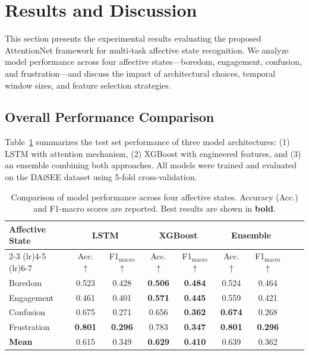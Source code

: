 \section{Results and Discussion}
\label{sec:results}

This section presents the experimental results evaluating the proposed AttentionNet framework for multi-task affective state recognition. We analyze model performance across four affective states---boredom, engagement, confusion, and frustration---and discuss the impact of architectural choices, temporal window sizes, and feature selection strategies.

\subsection{Overall Performance Comparison}
\label{subsec:overall-performance}

Table~\ref{tab:model-comparison} summarizes the test set performance of three model architectures: (1) LSTM with attention mechanism, (2) XGBoost with engineered features, and (3) an ensemble combining both approaches. All models were trained and evaluated on the DAiSEE dataset using 5-fold cross-validation.

\begin{table}[t]
\centering
\caption{Comparison of model performance across four affective states. Accuracy (Acc.) and F1-macro scores are reported. Best results are shown in \textbf{bold}.}
\label{tab:model-comparison}
\begin{tabular}{lcccccccc}
\toprule
\multirow{2}{*}{\textbf{Affective State}} & \multicolumn{2}{c}{\textbf{LSTM}} & \multicolumn{2}{c}{\textbf{XGBoost}} & \multicolumn{2}{c}{\textbf{Ensemble}} \\
\cmidrule(lr){2-3} \cmidrule(lr){4-5} \cmidrule(lr){6-7}
& Acc. $\uparrow$ & F1$_{\text{macro}}$ $\uparrow$ & Acc. $\uparrow$ & F1$_{\text{macro}}$ $\uparrow$ & Acc. $\uparrow$ & F1$_{\text{macro}}$ $\uparrow$ \\
\midrule
Boredom & 0.523 & 0.428 & \textbf{0.506} & \textbf{0.484} & 0.524 & 0.464 \\
Engagement & 0.461 & 0.401 & \textbf{0.571} & \textbf{0.445} & 0.559 & 0.421 \\
Confusion & 0.675 & 0.271 & 0.656 & \textbf{0.362} & \textbf{0.674} & 0.268 \\
Frustration & \textbf{0.801} & \textbf{0.296} & 0.783 & \textbf{0.347} & \textbf{0.801} & \textbf{0.296} \\
\midrule
\textbf{Mean} & 0.615 & 0.349 & \textbf{0.629} & \textbf{0.410} & 0.639 & 0.362 \\
\bottomrule
\end{tabular}
\end{table}

